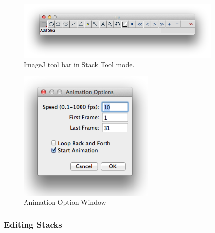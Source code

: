 \begin{indentexercise}{2}
\begin{figure}[htbp]
\begin{center}
\includegraphics[width=0.9\textwidth]{fig/fijiMenu_StackMode.png}
\caption{ ImageJ tool bar in Stack Tool mode.}
\label{fig:img130b}
\end{center}
\end{figure}

\begin{figure}[hbtp]
\begin{center}
\includegraphics[width=0.6\textwidth]{fig/animationOptions.png}
\caption{ Animation Option Window}
\label{fig:img131}
\end{center}
\end{figure}
\end{indentexercise}

\subsubsection{Editing Stacks}

